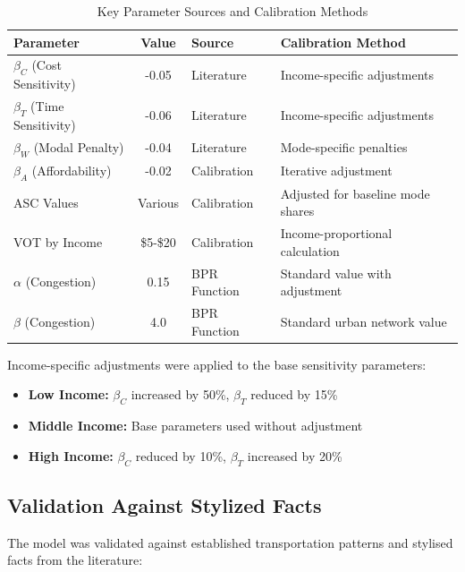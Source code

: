 \begin{table}[!ht]
\centering
\caption{Key Parameter Sources and Calibration Methods}
\begin{tabular}{lcll}
\toprule
\textbf{Parameter} & \textbf{Value} & \textbf{Source} & \textbf{Calibration Method} \\
\midrule
$\beta_C$ (Cost Sensitivity) & -0.05 & Literature & Income-specific adjustments \\
$\beta_T$ (Time Sensitivity) & -0.06 & Literature & Income-specific adjustments \\
$\beta_W$ (Modal Penalty) & -0.04 & Literature & Mode-specific penalties \\
$\beta_A$ (Affordability) & -0.02 & Calibration & Iterative adjustment \\
\midrule
ASC Values & Various & Calibration & Adjusted for baseline mode shares \\
VOT by Income & \$5-\$20 & Calibration& Income-proportional calculation \\
$\alpha$ (Congestion) & 0.15 & BPR Function & Standard value with adjustment \\
$\beta$ (Congestion) & 4.0 & BPR Function & Standard urban network value \\
\bottomrule
\end{tabular}
\end{table}

Income-specific adjustments were applied to the base sensitivity parameters:
\begin{itemize}
    \item \textbf{Low Income:} $\beta_C$ increased by 50\%, $\beta_T$ reduced by 15\%
    \item \textbf{Middle Income:} Base parameters used without adjustment
    \item \textbf{High Income:} $\beta_C$ reduced by 10\%, $\beta_T$ increased by 20\%
\end{itemize}

\subsection{Validation Against Stylized Facts}
The model was validated against established transportation patterns and stylised facts from the literature:


